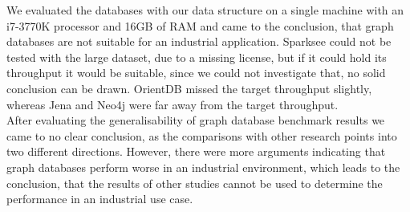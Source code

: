 We evaluated the databases with our data structure on a single machine with an i7-3770K processor and 16GB of RAM and came to the conclusion,
that graph databases are not suitable for an industrial application.
Sparksee could not be tested with the large dataset,
due to a missing license,
but if it could hold its throughput it would be suitable,
since we could not investigate that,
no solid conclusion can be drawn.
OrientDB missed the target throughput slightly,
whereas Jena and Neo4j were far away from the target throughput.\\
After evaluating the generalisability of graph database benchmark results we came to no clear conclusion,
as the comparisons with other research points into two different directions.
However,
there were more arguments indicating that graph databases perform worse in an industrial environment,
which leads to the conclusion,
that the results of other studies cannot be used to determine the performance in an industrial use case.

\cleardoublepage
